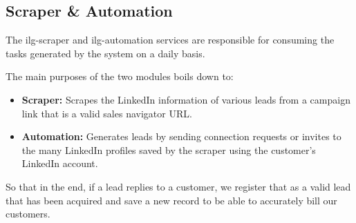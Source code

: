 \subsection{Scraper \& Automation}
The ilg-scraper and ilg-automation services are responsible for consuming the tasks generated by the system on a daily basis.

The main purposes of the two modules boils down to:
\begin{itemize}
	\item \textbf{Scraper:} Scrapes the LinkedIn information of various leads from a campaign link that is a valid sales navigator URL.
	\item \textbf{Automation:} Generates leads by sending connection requests or invites to the many LinkedIn profiles saved by the scraper using the customer's LinkedIn account.
\end{itemize}

So that in the end, if a lead replies to a customer, we register that as a valid lead that has been acquired and save a new record to be able to accurately bill our customers.

